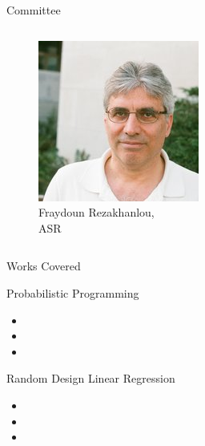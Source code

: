 \begin{frame}{Committee}
\begin{columns}[c]
\begin{column}{0.23\textwidth}
\begin{figure}
        \includegraphics[width=\textwidth,clip,trim={0cm 0 0cm 0}]{Figures/intro/fraydoun.jpg}
        \caption{\tiny Fraydoun Rezakhanlou,\\ ASR}
    \end{figure}
    \end{column}
    \end{columns}
\end{frame}

\begin{frame}{Works Covered}
    
    Probabilistic Programming
    {\tiny
    \begin{itemize}
        \item {}
        \item {}
        \item {}
    \end{itemize}
    }
    
    \pause
    
    Random Design Linear Regression
    
    {\tiny
    \begin{itemize}
        \item {}
        \item {}
        \item {}
    \end{itemize}
    }
\end{frame}